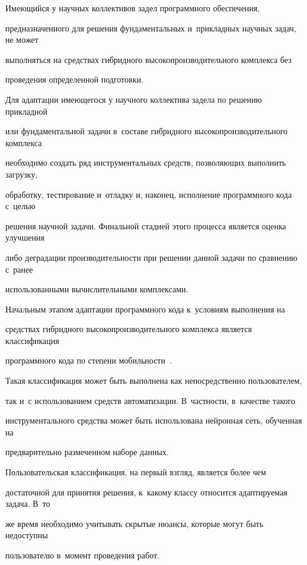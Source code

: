       Имеющийся у научных коллективов задел программного обеспечения, 

предназначенного для решения фундаментальных и~прикладных научных задач, не может 

выполняться на средствах гибридного высокопроизводительного комплекса без 

проведения определенной подготовки. 

      

      Для адаптации имеющегося у научного коллектива задела по решению прикладной 

или фундаментальной задачи в~составе гибридного высокопроизводительного комплекса 

необходимо создать ряд инструментальных средств, позволяющих выполнить загрузку, 

обработку, тестирование и~отладку и, наконец, исполнение программного кода с~целью 

решения научной задачи. Финальной стадией этого процесса является оценка улучшения 

либо деградации производительности при решении данной задачи по сравнению с~ранее 

использованными вычислительными комплексами.

      

      Начальным этапом адаптации программного кода к~условиям выполнения на 

средствах гибридного высокопроизводительного комплекса является классификация 

программного кода по степени мобильности~\cite{7-vol}.

      

      Такая классификация может быть выполнена как непосредственно пользователем, 

так и~с использованием средств автоматизации. В~частности, в~качестве такого 

инструментального средства может быть использована нейронная сеть, обученная на 

предварительно размеченном наборе данных. 

      

      Пользовательская классификация, на первый взгляд, является более чем 

достаточной для принятия решения, к~какому классу относится адаптируемая задача. В~то 

же время необходимо учитывать скрытые нюансы, которые могут быть недоступны 

пользователю в~момент проведения работ. 






